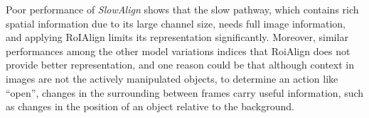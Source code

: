 Poor performance of \textit{SlowAlign} shows that the slow pathway, which contains rich spatial information due to its large channel size, needs full image information, and applying RoIAlign limits its representation significantly. Moreover, similar performances among the other model variations indices that RoiAlign does not provide better representation, and one reason could be that although context in images are not the actively manipulated objects, to determine an action like “open”, changes in the surrounding between frames carry useful information, such as changes in the position of an object relative to the background. 
